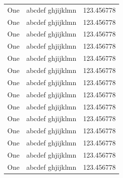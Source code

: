 \documentclass{article}
\begin{document}
\begin{center}
\begin{longtable}{|l|l|l|}
One & abcdef ghjijklmn & 123.456778 \\
One & abcdef ghjijklmn & 123.456778 \\
One & abcdef ghjijklmn & 123.456778 \\
One & abcdef ghjijklmn & 123.456778 \\
One & abcdef ghjijklmn & 123.456778 \\
One & abcdef ghjijklmn & 123.456778 \\
One & abcdef ghjijklmn & 123.456778 \\
One & abcdef ghjijklmn & 123.456778 \\
One & abcdef ghjijklmn & 123.456778 \\
One & abcdef ghjijklmn & 123.456778 \\
One & abcdef ghjijklmn & 123.456778 \\
One & abcdef ghjijklmn & 123.456778 \\
One & abcdef ghjijklmn & 123.456778 \\
One & abcdef ghjijklmn & 123.456778 \\
\end{longtable}
\end{center}
\end{document}
